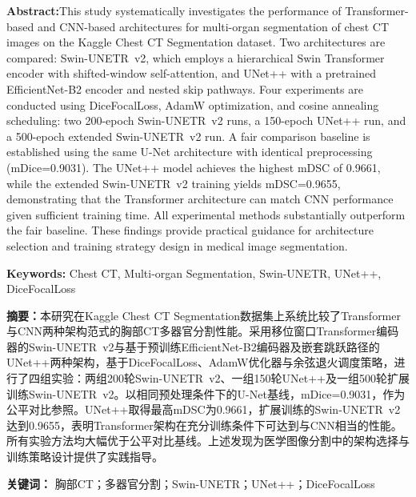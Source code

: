 \documentclass[12pt, a4paper]{article}
\begin{document}
\begin{center}
\begin{minipage}{0.9\textwidth}
\textbf{Abstract:}This study systematically investigates the performance of Transformer-based and CNN-based architectures for multi-organ segmentation of chest CT images on the Kaggle Chest CT Segmentation dataset. Two architectures are compared: Swin-UNETR~v2, which employs a hierarchical Swin Transformer encoder with shifted-window self-attention, and UNet++ with a pretrained EfficientNet-B2 encoder and nested skip pathways. Four experiments are conducted using DiceFocalLoss, AdamW optimization, and cosine annealing scheduling: two 200-epoch Swin-UNETR~v2 runs, a 150-epoch UNet++ run, and a 500-epoch extended Swin-UNETR~v2 run. A fair comparison baseline is established using the same U-Net architecture with identical preprocessing (mDice=0.9031). The UNet++ model achieves the highest mDSC of 0.9661, while the extended Swin-UNETR~v2 training yields mDSC=0.9655, demonstrating that the Transformer architecture can match CNN performance given sufficient training time. All experimental methods substantially outperform the fair baseline. These findings provide practical guidance for architecture selection and training strategy design in medical image segmentation.

\vspace{1cm}
\centering \textbf{Keywords:} Chest CT, Multi-organ Segmentation, Swin-UNETR, UNet++, DiceFocalLoss
\end{minipage}
\end{center}
\thispagestyle{empty}
\clearpage

\thispagestyle{empty}

\begin{center}
\begin{minipage}{0.9\textwidth}
\textbf{摘要：}本研究在Kaggle Chest CT Segmentation数据集上系统比较了Transformer与CNN两种架构范式的胸部CT多器官分割性能。采用移位窗口Transformer编码器的Swin-UNETR~v2与基于预训练EfficientNet-B2编码器及嵌套跳跃路径的UNet++两种架构，基于DiceFocalLoss、AdamW优化器与余弦退火调度策略，进行了四组实验：两组200轮Swin-UNETR~v2、一组150轮UNet++及一组500轮扩展训练Swin-UNETR~v2。以相同预处理条件下的U-Net基线，mDice=0.9031，作为公平对比参照。UNet++取得最高mDSC为0.9661，扩展训练的Swin-UNETR~v2达到0.9655，表明Transformer架构在充分训练条件下可达到与CNN相当的性能。所有实验方法均大幅优于公平对比基线。上述发现为医学图像分割中的架构选择与训练策略设计提供了实践指导。

\vspace{1cm}
\centering \textbf{关键词：} 胸部CT；多器官分割；Swin-UNETR；UNet++；DiceFocalLoss
\end{minipage}
\end{center}
\end{document}
